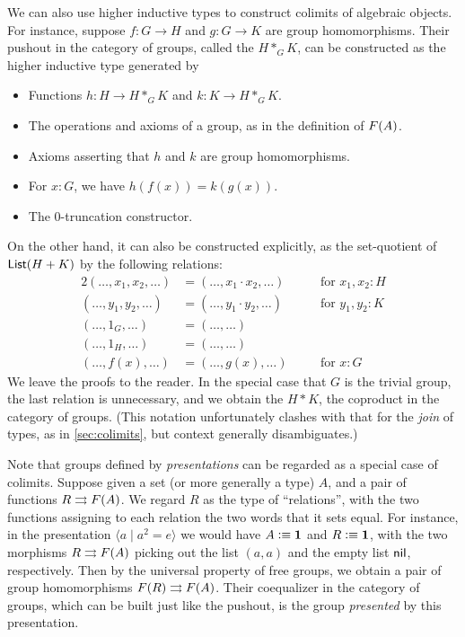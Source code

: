 We can also use higher inductive types to construct colimits of algebraic objects.
For instance, suppose $f:G\to H$ and $g:G\to K$ are group homomorphisms.
Their pushout in the category of groups, called the  $H *_G K$, can be constructed as the higher inductive type generated by
\begin{itemize}
\item Functions $h:H\to H *_G K$ and $k:K\to H *_G K$.
\item The operations and axioms of a group, as in the definition of $F(A)$.
\item Axioms asserting that $h$ and $k$ are group homomorphisms.
\item For $x:G$, we have $h(f(x)) = k(g(x))$.
\item The $0$-truncation constructor.
\end{itemize}
On the other hand, it can also be constructed explicitly, as the set-quotient of $\mathsf{List}(H+K)$ by the following relations:
\begin{alignat*}{2}
  (\dots, x_1, x_2, \dots) &= (\dots, x_1\cdot x_2, \dots)
  && \quad\text{for $x_1,x_2:H$}\\
  (\dots, y_1, y_2, \dots) &= (\dots, y_1\cdot y_2, \dots)
  && \quad\text{for $y_1,y_2:K$}\\
  (\dots, 1_G, \dots) &= (\dots, \dots) &&  \\
  (\dots, 1_H, \dots) &= (\dots, \dots) &&  \\
  (\dots, f(x), \dots) &= (\dots, g(x), \dots)
  && \quad\text{for $x:G$}
\end{alignat*}
We leave the proofs to the reader.
In the special case that $G$ is the trivial group, the last relation is unnecessary, and we obtain the  $H*K$, the coproduct in the category of groups.
(This notation unfortunately clashes with that for the \emph{join} of types, as in \autoref{sec:colimits}, but context generally disambiguates.)

Note that groups defined by \emph{presentations} can be regarded as a special case of colimits.
Suppose given a set (or more generally a type) $A$, and a pair of functions $R\rightrightarrows F(A)$.
We regard $R$ as the type of ``relations'', with the two functions assigning to each relation the two words that it sets equal.
For instance, in the presentation $\langle a \mid a^2 = e \rangle$ we would have $A\vcentcolon\equiv \mathbf{1}$ and $R\vcentcolon\equiv \mathbf{1}$, with the two morphisms $R\rightrightarrows F(A)$ picking out the list $(a,a)$ and the empty list $\mathsf{nil}$, respectively.
Then by the universal property of free groups, we obtain a pair of group homomorphisms $F(R) \rightrightarrows F(A)$.
Their coequalizer in the category of groups, which can be built just like the pushout, is the group \emph{presented} by this presentation.

